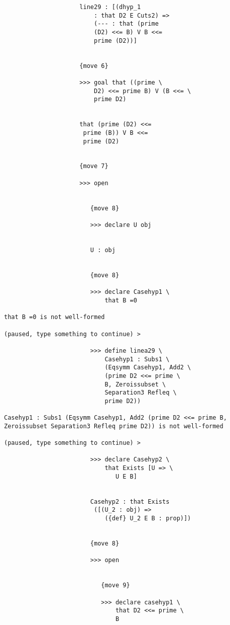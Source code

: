 \documentclass[12pt]{article}
\begin{document}
\begin{verbatim}
                     line29 : [(dhyp_1 
                         : that D2 E Cuts2) => 
                         (--- : that (prime 
                         (D2) <<= B) V B <<= 
                         prime (D2))]


                     {move 6}

                     >>> goal that ((prime \
                         D2) <<= prime B) V (B <<= \
                         prime D2)


                     that (prime (D2) <<= 
                      prime (B)) V B <<= 
                      prime (D2)


                     {move 7}

                     >>> open


                        {move 8}

                        >>> declare U obj


                        U : obj


                        {move 8}

                        >>> declare Casehyp1 \
                            that B =0

that B =0 is not well-formed

(paused, type something to continue) >

                        >>> define linea29 \
                            Casehyp1 : Subs1 \
                            (Eqsymm Casehyp1, Add2 \
                            (prime D2 <<= prime \
                            B, Zeroissubset \
                            Separation3 Refleq \
                            prime D2))

Casehyp1 : Subs1 (Eqsymm Casehyp1, Add2 (prime D2 <<= prime B, Zeroissubset Separation3 Refleq prime D2)) is not well-formed

(paused, type something to continue) >

                        >>> declare Casehyp2 \
                            that Exists [U => \
                               U E B]


                        Casehyp2 : that Exists 
                         ([(U_2 : obj) => 
                            ({def} U_2 E B : prop)])


                        {move 8}

                        >>> open


                           {move 9}

                           >>> declare casehyp1 \
                               that D2 <<= prime \
                               B



\end{verbatim}
\end{document}
